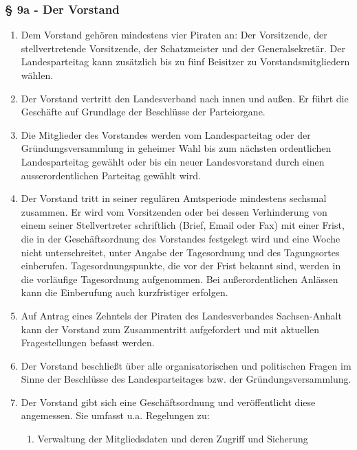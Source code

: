 \subsubsection{§ 9a - Der Vorstand}
\begin{enumerate}
\item Dem Vorstand gehören mindestens vier Piraten an: Der Vorsitzende, der
stellvertretende Vorsitzende, der Schatzmeister und der Generalsekretär. Der
Landesparteitag kann zusätzlich bis zu fünf Beisitzer zu Vorstandsmitgliedern
wählen.

\item Der Vorstand vertritt den Landesverband nach innen und außen. Er führt die
Geschäfte auf Grundlage der Beschlüsse der Parteiorgane.

\item Die Mitglieder des Vorstandes werden vom Landesparteitag oder der
Gründungsversammlung in geheimer Wahl bis zum nächsten ordentlichen
Landesparteitag gewählt oder bis ein neuer Landesvorstand durch einen
ausserordentlichen Parteitag gewählt wird.

\item Der Vorstand tritt in seiner regulären Amtsperiode mindestens sechsmal
zusammen. Er wird vom Vorsitzenden oder bei dessen Verhinderung von einem seiner
Stellvertreter schriftlich (Brief, Email oder Fax) mit einer Frist, die in der
Geschäftsordnung des Vorstandes festgelegt wird und eine Woche nicht
unterschreitet, unter Angabe der Tagesordnung und des Tagungsortes einberufen.
Tagesordnungspunkte, die vor der Frist bekannt sind, werden in die vorläufige
Tagesordnung aufgenommen. Bei außerordentlichen Anlässen kann die Einberufung
auch kurzfristiger erfolgen.

\item Auf Antrag eines Zehntels der Piraten des Landesverbandes Sachsen-Anhalt
kann der Vorstand zum Zusammentritt aufgefordert und mit aktuellen
Fragestellungen befasst werden.

\item Der Vorstand beschließt über alle organisatorischen und politischen Fragen
im Sinne der Beschlüsse des Landesparteitages bzw. der Gründungsversammlung.

\item Der Vorstand gibt sich eine Geschäftsordnung und veröffentlicht diese
angemessen. Sie umfasst u.a. Regelungen zu:
\begin{enumerate}
\item Verwaltung der Mitgliedsdaten und deren Zugriff und Sicherung


\end{enumerate}
\end{enumerate}
